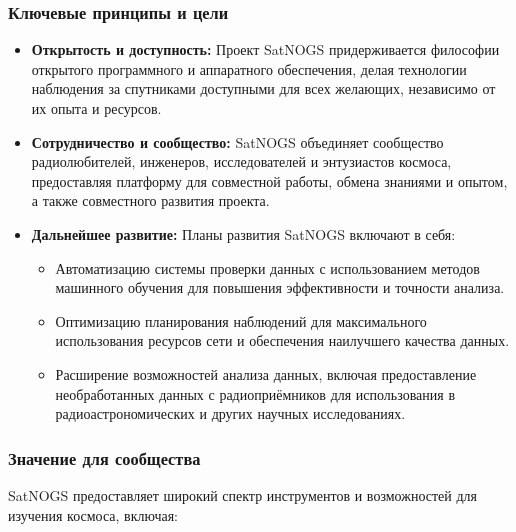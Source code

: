 \documentclass[12pt, a4paper]{extreport}
\begin{document}
\subsubsection{Ключевые принципы и цели}

\begin{itemize}
\item \textbf{Открытость и доступность:} Проект SatNOGS придерживается философии открытого программного и аппаратного обеспечения, делая технологии наблюдения за спутниками доступными для всех желающих, независимо от их опыта и ресурсов. 
\item \textbf{Сотрудничество и сообщество:} SatNOGS объединяет  сообщество радиолюбителей, инженеров, исследователей  и энтузиастов космоса, предоставляя платформу для совместной работы, обмена знаниями и опытом,  а также совместного развития проекта.
\item \textbf{Дальнейшее развитие:}  Планы  развития SatNOGS включают в себя:
    \begin{itemize}
    \item Автоматизацию системы проверки данных с использованием методов машинного обучения для повышения эффективности и точности анализа.
    \item Оптимизацию планирования наблюдений для  максимального использования ресурсов сети и обеспечения наилучшего качества данных.
    \item Расширение возможностей анализа данных,  включая предоставление необработанных данных с радиоприёмников для использования в радиоастрономических и других научных исследованиях.
    \end{itemize}
\end{itemize}


\subsubsection{Значение для сообщества}

SatNOGS предоставляет  широкий спектр инструментов и возможностей для изучения космоса,  включая:
\end{document}
